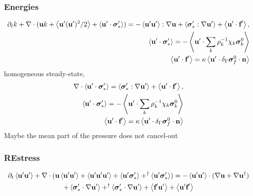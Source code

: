 \subsubsection{Energies}
\begin{align*}
    \partial_t k
    + \mathbf{\nabla}\cdot ( \textbf{u}k
    +  \left<\textbf{u}' (\textbf{u}')^2/2\right>
    + \left<\textbf{u}'\cdot \bm\sigma_*'\right>)
    =
    - \left<\textbf{u}'\textbf{u}'\right> : \mathbf{\nabla} \textbf{u}
    + \left<\bm\sigma_*':\mathbf{\nabla} \textbf{u}'\right> + \left< \textbf{u}'\cdot \textbf{f}'\right>,
    \\
    \left<\textbf{u}'\cdot \bm\sigma_*'\right>
    =
    - \left<\textbf{u}'\cdot \sum_k \rho^{-1}_k \chi_k \bm\sigma_k^0\right>\\
    \left<\textbf{u}'\cdot \textbf{f}'\right>
    =
    \kappa   \left<\textbf{u}' \cdot \delta_{\Gamma}  \bm\sigma_f^0 \cdot \textbf{n}\right>
    \\
\end{align*}
homogeneous steady-state, 
\begin{align*}
    \mathbf{\nabla}\cdot \left<\textbf{u}'\cdot \bm\sigma_*'\right>
    =
    \left<\bm\sigma_*':\mathbf{\nabla} \textbf{u}'\right> + \left< \textbf{u}'\cdot \textbf{f}'\right>,
    \\
    \left<\textbf{u}'\cdot \bm\sigma_*'\right>
    =
    - \left<\textbf{u}'\cdot \sum_k \rho^{-1}_k \chi_k \bm\sigma_k^0\right>\\
    \left<\textbf{u}'\cdot \textbf{f}'\right>
    =
    \kappa   \left<\textbf{u}' \cdot \delta_{\Gamma}  \bm\sigma_f^0 \cdot \textbf{n}\right>
    \\
\end{align*}
Maybe the mean part of the pressure does not cancel-out


\subsubsection{REstress}
\begin{multline}
    \partial_t \left<\textbf{u}'\textbf{u}'\right>
    + \mathbf{\nabla}\cdot (
         \textbf{u}\left<\textbf{u}'\textbf{u}'\right>
         +  \left<\textbf{u}' \textbf{u}'\textbf{u}'\right>
         + \left<\textbf{u}'\bm\sigma_*'\right>
         + ^\dagger\left<\textbf{u}'\bm\sigma_*'\right>)
         = 
         - \left<\textbf{u}'  \textbf{u}'\right>\cdot (\mathbf{\nabla}\textbf{u} + \mathbf{\nabla}\textbf{u}^\dagger)\\
    + \left<\bm\sigma_*'\cdot \mathbf{\nabla} \textbf{u}'\right>
    +^\dagger \left<\bm\sigma_*'\cdot \mathbf{\nabla} \textbf{u}'\right>
    + \left<\textbf{f}'\textbf{u}'\right>
    + \left<\textbf{u}'\textbf{f}'\right>
\end{multline}


